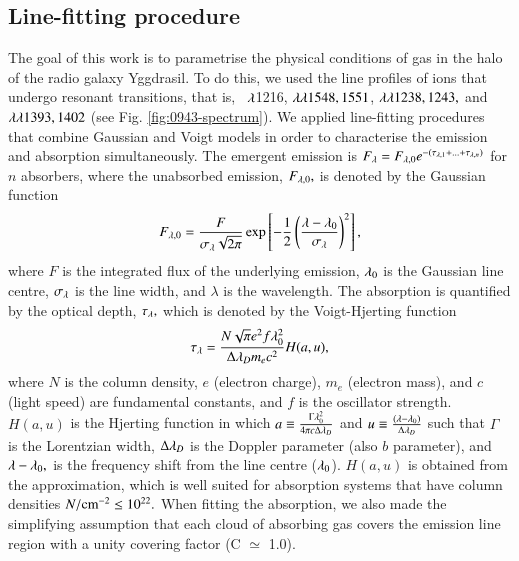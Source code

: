 \subsection{Line-fitting procedure}
The goal of this work is to parametrise the physical conditions of gas in the halo of the radio galaxy Yggdrasil. To do this, we used the line profiles of ions that undergo resonant transitions, that is, \lya~$\lambda$1216,  $\lambda\lambda1548,1551$,  $\lambda\lambda1238,1243,$ and  $\lambda\lambda1393, 1402 $ (see Fig. \ref{fig:0943-spectrum}). We applied line-fitting procedures that combine Gaussian and Voigt models in order to characterise the emission and absorption simultaneously. The emergent emission is $F_\lambda = F_{\lambda,0} e^{-(\tau_{\lambda,1} + ... + \tau_{\lambda,n}) }$ for $n$ absorbers, where the unabsorbed emission, $F_{\lambda,0},$ is denoted by the Gaussian function
\begin{equation}
F_{\lambda,0} = \frac{ F }{ \sigma_\lambda \sqrt{2\pi}} \exp\left[{-\frac{1}{2}\left(\frac{\lambda - \lambda_0}{\sigma_\lambda}\right)^2}\right]
,\end{equation}
where $F$ is the integrated flux of the underlying emission, $\lambda_0$ is the Gaussian line centre, $\sigma_\lambda$ is the line width, and $\lambda$ is the wavelength.
The absorption is quantified by the optical depth, $\tau_\lambda,$ which is denoted by the Voigt-Hjerting function
\begin{equation}
\tau_\lambda = \frac{ N\sqrt{\pi} e^2 f \lambda_0^2 }{ \Delta\lambda_D m_e c^2 }H(a,u),
\end{equation}
where $N$ is the column density, $e$ (electron charge), $m_e$ (electron mass), and $c$ (light speed) are fundamental constants, and $f$ is the oscillator strength. $H(a,u)$ is the Hjerting function in which $a \equiv\frac{\Gamma\lambda_0^2}{4\pi c \Delta\lambda_D}$ and $u \equiv\frac{(\lambda - \lambda_0)}{\Delta\lambda_D}$ such that $\Gamma$ is the Lorentzian width, $\Delta\lambda_D$ is the Doppler parameter (also $b$ parameter), and $\lambda - \lambda_0,$ is the frequency shift from the line centre ($\lambda_0$). $H(a,u)$ is obtained from the \citet{tepper-garcia2006} approximation, which is well suited for absorption systems that have column densities $ N/{\rm cm}^{-2} \leq10^{22}.$ When fitting the absorption, we also made the simplifying assumption that each cloud of absorbing gas covers the emission line region with a unity covering factor (C $\simeq$ 1.0).

